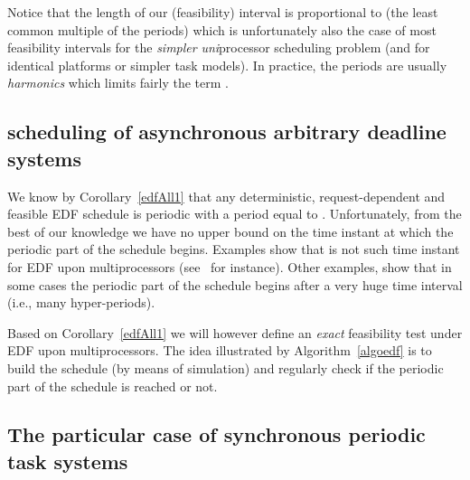 \documentclass[a4paper,11pt]{article}
\newcommand{\EDF}{\textrm{EDF}}
\begin{document}
Notice that the length of our (feasibility) interval is
proportional to  (the least common multiple of the
periods) which is unfortunately also the case of most
feasibility intervals for the \emph{simpler}
\emph{uni}processor scheduling problem (and for identical platforms or
simpler task models). In practice, the periods are usually
\emph{harmonics} which limits fairly the term .

\subsection{{} scheduling of asynchronous arbitrary
  deadline systems}\label{edf}

We know by Corollary~\ref{edfAll1} that any deterministic, request-dependent and feasible
\EDF{} schedule is periodic with a period equal to . Unfortunately,
from the best of our knowledge we have no upper bound on the time
instant at which the periodic part of the schedule begins. Examples
show that  is not such time instant for \EDF{} upon
multiprocessors (see~\cite{Braun2007Negative-Result} for instance).
Other examples, show that in some cases the periodic part of the
schedule begins after a very huge time interval (i.e., many
hyper-periods).

Based on Corollary~\ref{edfAll1} we will however define an \emph{exact} feasibility test under \EDF{} upon multiprocessors. The idea illustrated by Algorithm~\ref{algoedf} is to build the schedule (by means of simulation) and regularly check if the periodic part of the schedule is reached or not.

\begin{algorithm}
\caption{Exact EDF-feasibility test upon multiprocessors\label{algoedf}}
\end{algorithm}

\subsection{The particular case of synchronous periodic task
  systems} \label{labelSectFebSynch}
\end{document}
